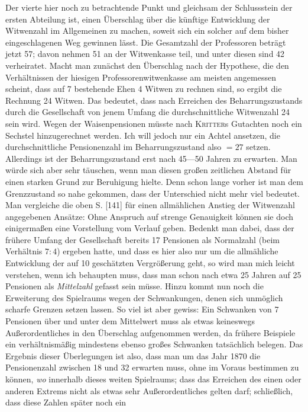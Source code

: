 Der vierte hier noch zu betrachtende Punkt und gleichsam der Schlussstein der ersten Abteilung ist, einen Überschlag über die künftige Entwicklung der Witwenzahl im Allgemeinen zu machen, soweit sich ein solcher auf dem bisher eingeschlagenen Weg gewinnen lässt. Die Gesamtzahl der Professoren beträgt jetzt 57; davon nehmen 51 an der Witwenkasse teil, und unter diesen sind 42 verheiratet. Macht man zunächst den Überschlag nach der Hypothese, die den Verhältnissen der hiesigen Professorenwitwenkasse am meisten angemessen scheint, dass auf 7 bestehende Ehen 4 Witwen zu rechnen sind, so ergibt die Rechnung 24 Witwen. Das bedeutet, dass nach Erreichen des Beharrungszustands durch die Gesellschaft von jenem Umfang die durchschnittliche Witwenzahl 24 sein wird. Wegen der Waisenpensionen müsste nach \textsc{Kritter}s Gutachten noch ein Sechstel hinzugerechnet werden. Ich will jedoch nur ein Achtel ansetzen, die durchschnittliche Pensionenzahl im Beharrungszustand also \(=27\) setzen. Allerdings ist der Beharrungszustand erst nach 45—50 Jahren zu erwarten. Man würde sich aber sehr täuschen, wenn man diesen großen zeitlichen Abstand für einen starken Grund zur Beruhigung hielte. Denn schon lange vorher ist man dem Grenzzustand so nahe gekommen, dass der Unterschied nicht mehr viel bedeutet. Man vergleiche die oben S. [141] für einen allmählichen Anstieg der Witwenzahl angegebenen Ansätze: Ohne Anspruch auf strenge Genauigkeit können sie doch einigermaßen eine Vorstellung vom Verlauf geben. Bedenkt man dabei, dass der frühere Umfang der Gesellschaft bereits 17 Pensionen als Normalzahl (beim Verhältnis \(7:4\)) ergeben hatte, und dass es hier also nur um die allmähliche Entwicklung der auf 10 geschätzten Vergrößerung geht, so wird man mich leicht verstehen, wenn ich behaupten muss, dass man schon nach etwa 25 Jahren auf 25 Pensionen als \textit{Mittelzahl} gefasst sein müsse. Hinzu kommt nun noch die Erweiterung des Spielraums wegen der Schwankungen, denen sich unmöglich scharfe Grenzen setzen lassen. So viel ist aber gewiss: Ein Schwanken von 7 Pensionen über und unter dem Mittelwert muss als etwas keineswegs Außerordentliches in den Überschlag aufgenommen werden, da frühere Beispiele ein verhältnismäßig mindestens ebenso großes Schwanken tatsächlich belegen. Das Ergebnis dieser Überlegungen ist also, dass man um das Jahr 1870 die Pensionenzahl zwischen 18 und 32 erwarten muss, ohne im Voraus bestimmen zu können, \textit{wo} innerhalb dieses weiten Spielraums; dass das Erreichen des einen oder anderen Extrems nicht als etwas sehr Außerordentliches gelten darf; schließlich, dass diese Zahlen später noch ein
